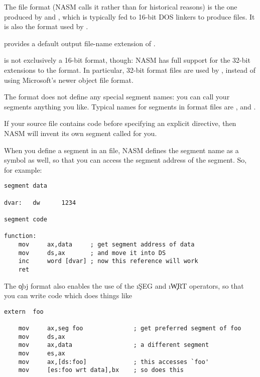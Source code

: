 The  file format (NASM calls it  rather than
 for historical reasons) is the one produced by 
and , which is typically fed to 16-bit DOS linkers
to produce  files. It is also the format used by
.

 provides a default output file-name extension of .

 is not exclusively a 16-bit format, though: NASM has full
support for the 32-bit extensions to the format. In particular,
32-bit  format files are used by , instead of using Microsoft's newer  object
file format.

The  format does not define any special segment names: you
can call your segments anything you like. Typical names for segments
in  format files are ,  and .

If your source file contains code before specifying an explicit
 directive, then NASM will invent its own segment called
 for you.

When you define a segment in an  file, NASM defines the
segment name as a symbol as well, so that you can access the segment
address of the segment. So, for example:

\begin{lstlisting}
segment data

dvar:   dw      1234

segment code

function:
    mov     ax,data     ; get segment address of data
    mov     ds,ax       ; and move it into DS
    inc     word [dvar] ; now this reference will work
    ret
\end{lstlisting}

The \c{obj} format also enables the use of the \i\c{SEG} and
\i\c{WRT} operators, so that you can write code which does things
like

\begin{lstlisting}
extern  foo

    mov     ax,seg foo              ; get preferred segment of foo
    mov     ds,ax
    mov     ax,data                 ; a different segment
    mov     es,ax
    mov     ax,[ds:foo]             ; this accesses `foo'
    mov     [es:foo wrt data],bx    ; so does this
\end{lstlisting}

